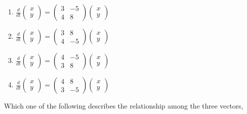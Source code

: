     \begin{multicols}{2}
    \begin{enumerate}
    \item 
$\frac{d}{dt}
\begin{pmatrix}
x \\
y
\end{pmatrix}
=
\begin{pmatrix}
3 & -5 \\
4 & 8
\end{pmatrix}
\begin{pmatrix}
x \\
y
\end{pmatrix}
$
\item $
\frac{d}{dt}
\begin{pmatrix}
x \\
y
\end{pmatrix}
=
\begin{pmatrix}
3 & 8 \\
4 & -5
\end{pmatrix}
\begin{pmatrix}
x \\
y
\end{pmatrix}
$
    \item $
\frac{d}{dt}
\begin{pmatrix}
x \\
y
\end{pmatrix}
=
\begin{pmatrix}
4 & -5 \\
3 & 8
\end{pmatrix}
\begin{pmatrix}
x \\
y
\end{pmatrix}
$

\item $
\frac{d}{dt}
\begin{pmatrix}
x \\
y
\end{pmatrix}
=
\begin{pmatrix}
4 & 8 \\
3 & -5
\end{pmatrix}
\begin{pmatrix}
x \\
y
\end{pmatrix}
$
\end{enumerate}
\end{multicols}
\item 
Which one of the following describes the relationship among the three vectors, 

